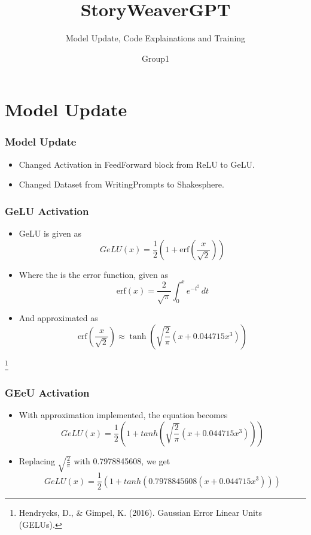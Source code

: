 \documentclass[
    10pt %
    16:9, %
]{beamer}
\title{StoryWeaverGPT}
\subtitle{Model Update, Code Explainations and Training}
\author{Group1}
\begin{document}
\frame{\titlepage}
\section[Outline]{}
\frame{\tableofcontents}

\section{Model Update}
 
\frame
{
  \frametitle{Model Update}
 
  \begin{itemize}
    \item Changed Activation in FeedForward block from ReLU to GeLU.
    \item Changed Dataset from WritingPrompts to Shakesphere.
  \end{itemize}
  
\vfill   
}

\frame
{
  \frametitle{GeLU Activation}
  \begin{itemize}
    \item GeLU is given as \[
    GeLU(x) = \frac{1}{2}(1 + \text{erf}\left(\frac{x}{\sqrt{2}}\right))
    \]
    \item Where the  is the error function, given as \[
    \text{erf}(x) = \frac{2}{\sqrt{\pi}} \int_{0}^{x} e^{-t^2} \, dt
    \]
    \item And approximated as \[
    \text{erf}\left(\frac{x}{\sqrt{2}}\right) \approx \tanh\left(\sqrt{\frac{2}{\pi}}\left(x + 0.044715x^3\right)\right)
    \]
  \end{itemize}

  \vfill

  \footnote{Hendrycks, D., \& Gimpel, K. (2016). Gaussian Error Linear Units (GELUs).}
}

\frame
{
  \frametitle{GEeU Activation}
  \begin{itemize}
    \item With approximation implemented, the equation becomes \[
    GeLU(x) = \frac{1}{2}(1 + tanh(\sqrt{\frac{2}{\pi}}(x + 0.044715x^3)))
    \]
    \item Replacing $\sqrt{\frac{2}{\pi}}$ with 0.7978845608, we get \[
    GeLU(x) = \frac{1}{2}(1 + tanh(0.7978845608(x + 0.044715x^3)))
    \]
  \end{itemize}

\vfill
}
\end{document}
